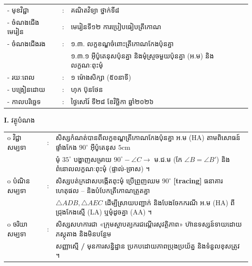\documentclass[a4paper,10pt]{article}
\newcommand{\wcirc}{{\CourierBullet\fontsize{9.5pt}{11pt}\selectfont o}}
\newcommand{\cnum}[1]{{\fontsize{10.5pt}{12pt}\selectfont\ding{\numexpr181+#1\relax}}\hspace{0.2em}}
\newcommand{\tri}[1]{\ensuremath{\triangle #1}}
\newcommand{\ang}[1]{\ensuremath{\angle #1}}
\begin{document}
{\renewcommand{\arraystretch}{1.00}
\hspace*{4.6cm}%
\begin{tabular}{@{}l l l@{}}
  - \hspace{0.35cm} មុខវិជ្ជា & : & គណិតវិទ្យា ថ្នាក់ទី៨ \\
  - \hspace{0.35cm} ចំណងជើងមេរៀន & : & មេរៀនទី១២ ការប្រៀបធៀបត្រីកោណ \\
  - \hspace{0.35cm} ចំណងជើងរង & : & ១.៣. លក្ខខណ្ឌចំពោះត្រីកោណកែងប៉ុនគ្នា \\
  & & ១.៣.១ អ៊ីប៉ូតេនុសប៉ុនគ្នា និងមុំស្រួចមួយប៉ុនគ្នា (អ.ម) និងលក្ខណៈពុះមុំ \\
  - \hspace{0.35cm} រយៈពេល & : & ១ ម៉ោងសិក្សា (៥០នាទី) \\
  - \hspace{0.35cm} បង្រៀនដោយ & : & ហុក ប៊ុនថែន \\
  - \hspace{0.35cm} កាលបរិច្ឆេទ & : & ថ្ងៃសៅរ៍ ទី២៨ ខែវិច្ឆិកា ឆ្នាំ២០២៦ \\
\end{tabular}

\vspace{1pt}

\textbf{I.} {\muol វត្ថុបំណង}\\[1pt]
\hspace*{0.55cm}%
\begin{tabular}{@{}l l l@{}}
  \wcirc \hspace{0.25cm} វិជ្ជាសម្បទា & : & សិស្សកំណត់បានពីលក្ខខណ្ឌត្រីកោណកែងប៉ុនគ្នា អ.ម (HA) តាមពិសោធន៍ផ្ទាំងកែង $90^\circ$ អ៊ីប៉ូតេនុស $5\text{cm}$ \\
  & & មុំ $35^\circ$ បង្ហាញសម្រាយ $90^\circ{-}\ang{C}\to$ ម.ជ.ម (កែ $\ang{B}=\ang{B'}$) និងពំនោលលក្ខណៈពុះមុំ (ផ្ទាល់-ច្រាស) ។ \\
  \wcirc \hspace{0.25cm} បំណិនសម្បទា & : & សិស្សបត់ក្រដាសបង្កើតពុះមុំ ប្រើព្រួញឈម $90^\circ$ \textbf{[tracing]} ធនាគារហេតុផល \cnum{1}--\cnum{5} និងបំបែកត្រីកោណត្រួតគ្នា \\
  & & $\tri{ADB}, \tri{AEC}$ ដើម្បីស្រាយបញ្ជាក់ និងបែងចែកករណី អ.ម (HA) ពីជ្រុងកែងស្មើ (LA) ឬមុំដូចគ្នា (AA) ។ \\
  \wcirc \hspace{0.25cm} ចរិយាសម្បទា & : & សិស្សសហការជា «ក្រុមស្ថាបត្យករជណ្ដើរសុវត្ថិភាព» ហ៊ានទស្សន៍ទាយដោយភស្តុតាង និងមិនបន្ថែម \\
  & & សញ្ញាស្មើ \textbf{/} មុនការសន្និដ្ឋាន ប្រកបដោយភាពប្រុងប្រយ័ត្ន និងទំនួលខុសត្រូវ ។ \\
\end{tabular}

}
\end{document}
